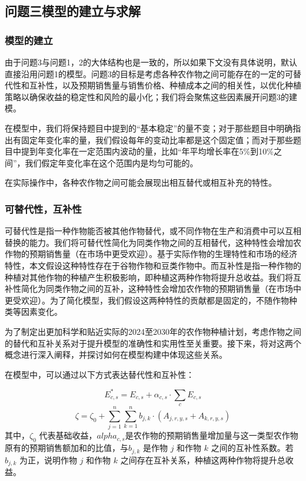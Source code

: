 \documentclass{cumcmthesis}
\begin{document}
\subsection{问题三模型的建立与求解}
\subsubsection{模型的建立}
由于问题3与问题1，2的大体结构也是一致的，所以如果下文没有具体说明，默认直接沿用问题1的模型。问题3的目标是考虑各种农作物之间可能存在的一定的可替代性和互补性，以及预期销售量与销售价格、种植成本之间的相关性，以优化种植策略以确保收益的稳定性和风险的最小化；我们将会聚焦这些因素展开问题3的建模。

在模型中，我们将保持题目中提到的“基本稳定”的量不变；对于那些题目中明确指出有固定年变化率的量，我们假设每年的变动比率都是这个固定值；而对于那些题目中提到年变化率在一定范围内波动的量，比如“年平均增长率在5\%到10\%之间”，我们假定年变化率在这个范围内是均匀可能的。

在实际操作中，各种农作物之间可能会展现出相互替代或相互补充的特性。
\subsubsection{可替代性，互补性}
可替代性是指一种作物能否被其他作物替代，或不同作物在生产和消费中可以互相替换的能力。我们将可替代性简化为同类作物之间的互相替代，这种特性会增加农作物的预期销售量（在市场中更受欢迎）。基于实际作物的生理特性和市场的经济特性，本文假设这种特性存在于谷物作物\cite{ref4}和豆类作物\cite{ref5}中。而互补性是指一种作物的种植对其他作物的种植产生积极影响，即种植这两种作物将提升总收益。我们将互补性简化为同类作物之间的互补，这种特性会增加农作物的预期销售量（在市场中更受欢迎）。为了简化模型，我们假设这两种特性的贡献都是固定的，不随作物种类等因素变化。

为了制定出更加科学和贴近实际的2024至2030年的农作物种植计划，考虑作物之间的替代和互补关系对于提升模型的准确性和实用性至关重要。接下来，将对这两个概念进行深入阐释，并探讨如何在模型构建中体现这些关系。

在模型中，可以通过以下方式表达替代性和互补性：

\begin{equation}
E^*_{c,s} = E_{c,s}   + \alpha_{c,s} \cdot \sum_{c} E_{c,s}
\end{equation}
\begin{equation}
    \zeta = \zeta_0 + \sum_{j=1}^{n} \sum_{k=1}^{n} b_{j,k} \cdot (A_{j,r,y,s} + A_{k,r,y,s})
\end{equation}
    其中，$\zeta_0$ 代表基础收益，$alpha_{c,s}$是农作物的预期销售量增加量与这一类型农作物原有的预期销售额加和的比值，与$b_{j,k}$ 是作物 $j$ 和作物 $k$ 之间的互补性系数。若 $b_{j,k}$ 为正，说明作物 $j$ 和作物 $k$ 之间存在互补关系，种植这两种作物将提升总收益。
\end{document}
